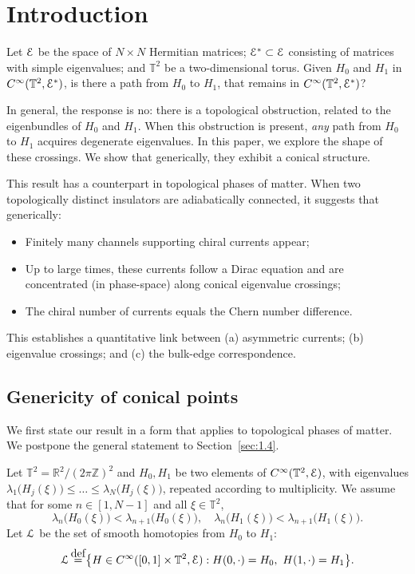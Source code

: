 \documentclass[11pt]{article}
\numberwithin{equation}{section}
\let\pazocal\EuScript
\let\sep:
\theoremstyle{definition}
\newcommand{\EE}{\pazocal{E}}
\newcommand{\LL}{{\pazocal{L}}}
\newcommand{\R}{\mathbb{R}}
\newcommand{\Z}{\mathbb{Z}}
\newcommand{\Tt}{{\mathbb{T}}}
\newcommand{\de}{\,\mathrel{\stackrel{\makebox[0pt]{\mbox{\normalfont\tiny def}}}{=}}}
\begin{document}
\section{Introduction}

Let $\EE$ be the space of $N \times N$ Hermitian matrices; $\EE^* \subset \EE$ consisting of matrices with simple eigenvalues; and $\Tt^2$ be a two-dimensional torus. Given $H_0$ and $H_1$ in $C^\infty(\Tt^2,\EE^*)$, is there a path from $H_0$ to $H_1$, that remains in $C^\infty(\Tt^2,\EE^*)$?

In general, the response is no: there is a topological obstruction, related to the eigenbundles of $H_0$ and $H_1$. When this obstruction is present, \textit{any} path from $H_0$ to $H_1$ acquires degenerate eigenvalues. In this paper, we explore the shape of these crossings. We show that generically, they exhibit a conical structure.

This result has a counterpart in topological phases of matter. When two topologically distinct insulators are adiabatically connected, it suggests that generically:
\begin{itemize}
\item Finitely many channels supporting chiral currents appear;
\item Up to large times, these currents follow a Dirac equation and are concentrated (in phase-space) along conical eigenvalue crossings;
\item The chiral number of currents equals the Chern number difference.
\end{itemize}
This establishes a quantitative link between (a) asymmetric currents; (b) eigenvalue crossings; and (c) the bulk-edge correspondence.

\subsection{Genericity of conical points}\label{sec:1.1} We first state our result in a form that applies to topological phases of matter. We postpone the general statement to Section~\ref{sec:1.4}.

Let $\Tt^2 = \R^2/(2\pi\Z)^2$ and $H_0, H_1$ be two elements of $C^\infty(\Tt^2,\EE)$, with eigenvalues $\lambda_1\bigl( H_j(\xi) \bigr) \leq \dots \leq \lambda_N\bigl( H_j(\xi) \bigr)$, repeated according to multiplicity. We assume that for some $n \in [1,N-1]$ and all $\xi \in \Tt^2$,
\begin{equation}\label{eq:1e}
\lambda_n\bigl(H_0(\xi)\bigr) < \lambda_{n+1}\bigl(H_0(\xi)\bigr), \quad \lambda_n\bigl(H_1(\xi)\bigr) < \lambda_{n+1}\bigl(H_1(\xi)\bigr).
\end{equation}
Let $\LL$ be the set of smooth homotopies from $H_0$ to $H_1$:
\begin{equation*}
\LL \de \bigl\{ H \in C^\infty([0,1] \times \Tt^2, \EE)\sep H(0,\cdot) = H_0, \ H(1,\cdot) = H_1\bigr\}.
\end{equation*}
\end{document}
